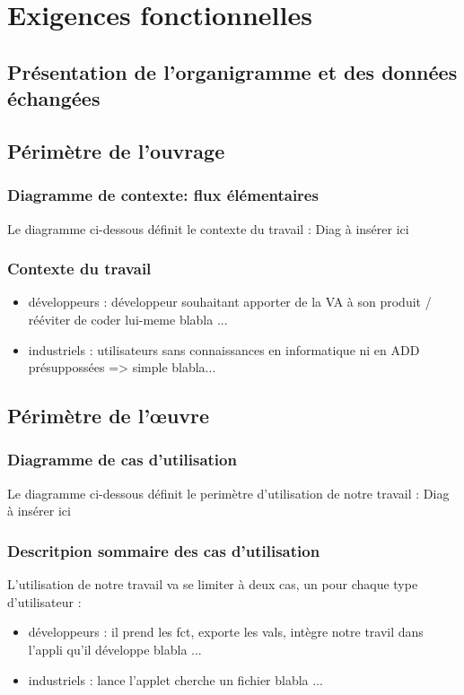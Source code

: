	\section{Exigences fonctionnelles}
	
		\subsection{Présentation de l'organigramme et des données échangées}
	
		\subsection{Périmètre de l'ouvrage}
		
			\subsubsection{Diagramme de contexte: flux élémentaires}
				Le diagramme ci-dessous définit le contexte du travail :
					{\color{red}
					Diag à insérer ici
					}
			
			\subsubsection{Contexte du travail}
				\begin{itemize}
				\item développeurs : {\color{red} développeur souhaitant apporter de la VA à son produit / rééviter de coder lui-meme blabla ...}
				\item industriels : {\color{red} utilisateurs sans connaissances en informatique ni en ADD présuppossées => simple blabla...}
				\end{itemize}
				
		\subsection{Périmètre de l'œuvre}
		
			\subsubsection{Diagramme de cas d'utilisation}
				Le diagramme ci-dessous définit le perimètre d'utilisation de notre travail :
					{\color{red}
					Diag à insérer ici
					}
				
			\subsubsection{Descritpion sommaire des cas d'utilisation}
				L'utilisation de notre travail va se limiter à deux cas, un pour chaque type d'utilisateur :
				\begin{itemize}
				\item développeurs : {\color{red} il prend les fct, exporte les vals, intègre notre travil dans l'appli qu'il développe blabla ...}
				\item industriels : {\color{red} lance l'applet cherche un fichier blabla ...}
				\end{itemize}
				
